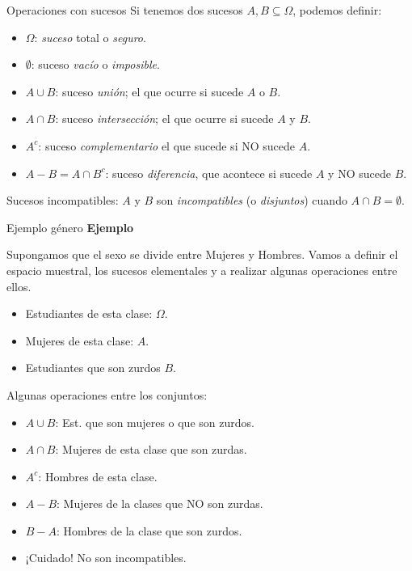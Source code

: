 \documentclass[
  ignorenonframetext,
]{beamer}
\providecommand{\tightlist}{%
  \setlength{\itemsep}{0pt}\setlength{\parskip}{0pt}}
\begin{document}
\begin{frame}{Operaciones con sucesos}
\protect\hypertarget{operaciones-con-sucesos}{}
Si tenemos dos sucesos \(A,B\subseteq \Omega\), podemos definir:

\begin{itemize}
\tightlist
\item
  \(\Omega\): \emph{suceso} total o \emph{seguro}.
\item
  \(\emptyset\): suceso \emph{vacío} o \emph{imposible}.
\item
  \(A\cup B\): suceso \emph{unión}; el que ocurre si sucede \(A\) o
  \(B\).
\item
  \(A\cap B\): suceso \emph{intersección}; el que ocurre si sucede \(A\)
  y \(B\).
\item
  \(A^c\): suceso \emph{complementario} el que sucede si NO sucede
  \(A\).
\item
  \(A- B=A\cap B^c\): suceso \emph{diferencia}, que acontece si sucede
  \(A\) y NO sucede \(B\).
\end{itemize}

Sucesos incompatibles: \(A\) y \(B\) son \emph{incompatibles} (o
\emph{disjuntos}) cuando \(A\cap B=\emptyset\).
\end{frame}

\begin{frame}{Ejemplo género}
\protect\hypertarget{ejemplo-guxe9nero}{}
\textbf{Ejemplo}

Supongamos que el sexo se divide entre Mujeres y Hombres. Vamos a
definir el espacio muestral, los sucesos elementales y a realizar
algunas operaciones entre ellos.

\begin{itemize}
\tightlist
\item
  Estudiantes de esta clase: \(\Omega\).
\item
  Mujeres de esta clase: \(A\).
\item
  Estudiantes que son zurdos \(B\).
\end{itemize}

Algunas operaciones entre los conjuntos:

\begin{itemize}
\tightlist
\item
  \(A\cup B\): Est. que son mujeres o que son zurdos.
\item
  \(A\cap B\): Mujeres de esta clase que son zurdas.
\item
  \(A^c\): Hombres de esta clase.
\item
  \(A-B\): Mujeres de la clases que NO son zurdas.
\item
  \(B-A\): Hombres de la clase que son zurdos.
\item
  ¡Cuidado! No son incompatibles.
\end{itemize}
\end{frame}
\end{document}
